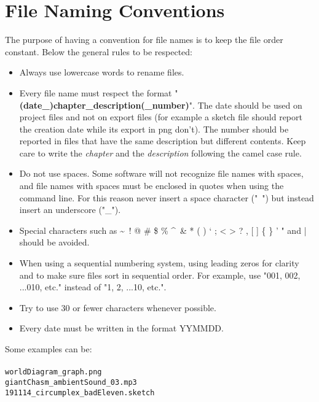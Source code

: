 \section{File Naming Conventions}
The purpose of having a convention for file names is to keep the file order constant. Below the general rules to be respected:
\begin{itemize}
	\item Always use lowercase words to rename files.
	\item Every file name must respect the format "\textbf{(date\_)chapter\_description(\_number)}". The date should be used on project files and not on export files (for example a sketch file should report the creation date while its export in png don't). The number should be reported in files that have the same description but different contents. Keep care to write the \textit{chapter} and the \textit{description} following the camel case rule.
	\item Do not use spaces. Some software will not recognize file names with spaces, and file names with spaces must be enclosed in quotes when using the command line. For this reason never insert a space character ("\ ") but instead insert an underscore ("\_").
	\item Special characters such as \textasciitilde\ ! @ \# \$ \% \textasciicircum\ \& * ( ) ` ; < > ? , [ ] \{ \} ' " and | should be avoided.
	\item When using a sequential numbering system, using leading zeros for clarity and to make sure files sort in sequential order. For example, use "001, 002, ...010, etc." instead of "1, 2, ...10, etc.".
	\item Try to use 30 or fewer characters whenever possible.
	\item Every date must be written in the format YYMMDD.
\end{itemize}

Some examples can be:
\\\\
\texttt{worldDiagram\_graph.png}\\
\texttt{giantChasm\_ambientSound\_03.mp3}\\
\texttt{191114\_circumplex\_badEleven.sketch}\\
